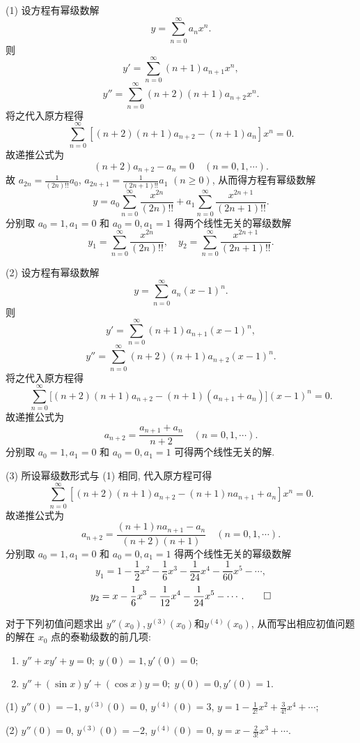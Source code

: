 \begin{solve}
  (1) 设方程有幂级数解
  \[y=\sum_{n=0}^{\infty}a_nx^n.\]
  则
  \[y'=\sum_{n=0}^{\infty}(n+1)a_{n+1}x^n,\]
  \[y''=\sum_{n=0}^{\infty}(n+2)(n+1)a_{n+2}x^n.\]
  将之代入原方程得
  \[\sum_{n=0}^{\infty}[(n+2)(n+1)a_{n+2}-(n+1)a_n]x^n=0.\]
  故递推公式为
  \[(n+2)a_{n+2}-a_n=0\quad (n=0,1,\cdots).\]
  故 $a_{2n}=\frac{1}{(2n)!!}a_0$, $a_{2n+1}=\frac{1}{(2n+1)!!}a_1$ $(n\geq 0)$, 从而得方程有幂级数解
  \[y=a_0\sum_{n=0}^{\infty}\frac{x^{2n}}{(2n)!!}+a_1\sum_{n=0}^{\infty}\frac{x^{2n+1}}{(2n+1)!!}.\]
  分别取 $a_0=1,a_1=0$ 和 $a_0=0,a_1=1$ 得两个线性无关的幂级数解
  \[y_1=\sum_{n=0}^{\infty}\frac{x^{2n}}{(2n)!!},\quad
    y_2=\sum_{n=0}^{\infty}\frac{x^{2n+1}}{(2n+1)!!}.\]

  (2) 设方程有幂级数解
  \[y=\sum_{n=0}^{\infty}a_n(x-1)^n.\]
  则
  \[y'=\sum_{n=0}^{\infty}(n+1)a_{n+1}(x-1)^n,\]
  \[y''=\sum_{n=0}^{\infty}(n+2)(n+1)a_{n+2}(x-1)^n.\]
  将之代入原方程得
  \[\sum_{n=0}^{\infty}\big[(n+2)(n+1)a_{n+2}-(n+1)(a_{n+1}+a_n)\big](x-1)^n=0.\]
  故递推公式为
  \[a_{n+2}=\frac{a_{n+1}+a_n}{n+2}\quad (n=0,1,\cdots).\]
  分别取 $a_0=1,a_1=0$ 和 $a_0=0,a_1=1$ 可得两个线性无关的解.

  (3) 所设幂级数形式与 (1) 相同, 代入原方程可得
  \[\sum_{n=0}^{\infty}[(n+2)(n+1)a_{n+2}-(n+1)na_{n+1}+a_n]x^n=0.\]
  故递推公式为
  \[a_{n+2}=\frac{(n+1)na_{n+1}-a_n}{(n+2)(n+1)}\quad (n=0,1,\cdots).\]
  分别取 $a_0=1,a_1=0$ 和 $a_0=0,a_1=1$ 得两个线性无关的幂级数解
  \[y_1=1-\frac{1}{2}x^2-\frac{1}{6}x^3-\frac{1}{24}x^4-\frac{1}{60}x^5-\cdots,\]
  \[y_2=x-\frac{1}{6}x^3-\frac{1}{12}x^4-\frac{1}{24}x^5-\cdots.\qedhere\]
\end{solve}



\begin{exercise}
  对于下列初值问题求出 $y''(x_0),y^{(3)}(x_0)$和$y^{(4)}(x_0)$, 
  从而写出相应初值问题的解在 $x_0$ 点的泰勒级数的前几项:
  \begin{enumerate}[(1)]
  \item $y''+xy'+y=0;\;y(0)=1,y'(0)=0;$
  \item $y''+(\sin x)y'+(\cos x)y=0;\;y(0)=0,y'(0)=1$.\
  \end{enumerate}
\end{exercise}

\begin{solve}
  (1) $y''(0)=-1$, $y^{(3)}(0)=0$, $y^{(4)}(0)=3$, $y=1-\frac{1}{2!}x^2+\frac{3}{4!}x^4+\cdots$;

  (2) $y''(0)=0$, $y^{(3)}(0)=-2$, $y^{(4)}(0)=0$, $y=x-\frac{2}{3!}x^3+\cdots$.
\end{solve}



